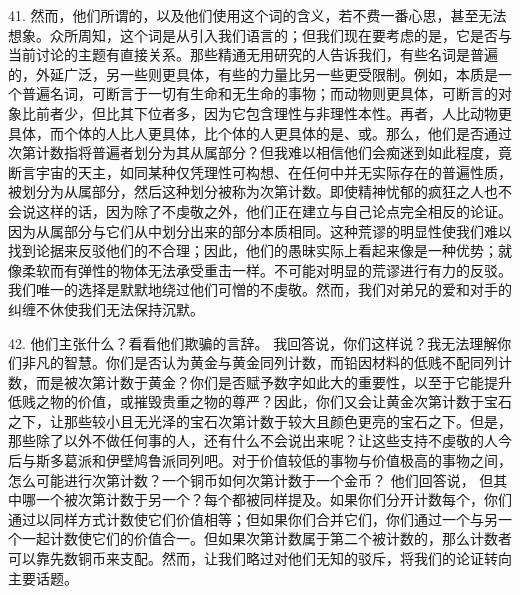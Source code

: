 41. 然而，他们所谓的，以及他们使用这个词的含义，若不费一番心思，甚至无法想象。众所周知，这个词是从引入我们语言的；但我们现在要考虑的是，它是否与当前讨论的主题有直接关系。那些精通无用研究的人告诉我们，有些名词是普遍的，外延广泛，另一些则更具体，有些的力量比另一些更受限制。例如，本质是一个普遍名词，可断言于一切有生命和无生命的事物；而动物则更具体，可断言的对象比前者少，但比其下位者多，因为它包含理性与非理性本性。再者，人比动物更具体，而个体的人比人更具体，比个体的人更具体的是、或。那么，他们是否通过次第计数指将普遍者划分为其从属部分？但我难以相信他们会痴迷到如此程度，竟断言宇宙的天主，如同某种仅凭理性可构想、在任何中并无实际存在的普遍性质，被划分为从属部分，然后这种划分被称为次第计数。即使精神忧郁的疯狂之人也不会说这样的话，因为除了不虔敬之外，他们正在建立与自己论点完全相反的论证。因为从属部分与它们从中划分出来的部分本质相同。这种荒谬的明显性使我们难以找到论据来反驳他们的不合理；因此，他们的愚昧实际上看起来像是一种优势；就像柔软而有弹性的物体无法承受重击一样。不可能对明显的荒谬进行有力的反驳。我们唯一的选择是默默地绕过他们可憎的不虔敬。然而，我们对弟兄的爱和对手的纠缠不休使我们无法保持沉默。\par

42. 他们主张什么？看看他们欺骗的言辞。  我回答说，你们这样说？我无法理解你们非凡的智慧。你们是否认为黄金与黄金同列计数，而铅因材料的低贱不配同列计数，而是被次第计数于黄金？你们是否赋予数字如此大的重要性，以至于它能提升低贱之物的价值，或摧毁贵重之物的尊严？因此，你们又会让黄金次第计数于宝石之下，让那些较小且无光泽的宝石次第计数于较大且颜色更亮的宝石之下。但是，那些除了以外不做任何事的人，还有什么不会说出来呢？让这些支持不虔敬的人今后与斯多葛派和伊壁鸠鲁派同列吧。对于价值较低的事物与价值极高的事物之间，怎么可能进行次第计数？一个铜币如何次第计数于一个金币？ 他们回答说， 但其中哪一个被次第计数于另一个？每个都被同样提及。如果你们分开计数每个，你们通过以同样方式计数使它们价值相等；但如果你们合并它们，你们通过一个与另一个一起计数使它们的价值合一。但如果次第计数属于第二个被计数的，那么计数者可以靠先数铜币来支配。然而，让我们略过对他们无知的驳斥，将我们的论证转向主要话题。\par

